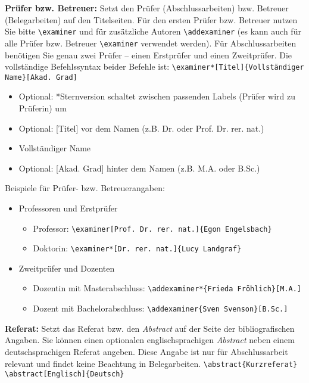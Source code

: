 \documentclass[
%
	thesis=paper,		%
	compactlistof,		%
	noauthorship,		%
%
	fancy,				%
%
%
]{hsmw-thesis}
\begin{document}
	\textbf{Prüfer bzw. Betreuer:}\label{cmd:examiner}
	Setzt den Prüfer (Abschlussarbeiten) bzw. Betreuer (Belegarbeiten) auf den Titelseiten.
	Für den ersten Prüfer bzw. Betreuer nutzen Sie bitte \verb|\examiner| und für zusätzliche Autoren \verb|\addexaminer| (es kann auch für alle Prüfer bzw. Betreuer \verb|\examiner| verwendet werden).
	Für Abschlussarbeiten benötigen Sie genau zwei Prüfer --  einen Erstprüfer und einen Zweitprüfer.
	Die vollständige Befehlssyntax beider Befehle ist:
	\newline
	\verb|\examiner*[Titel]{Vollständiger Name}[Akad. Grad]|
	\begin{itemize}
		\item Optional: *Sternversion schaltet zwischen passenden Labels (Prüfer wird zu Prüferin) um
		\item Optional: [Titel] vor dem Namen (z.B. Dr. oder Prof. Dr. rer. nat.)
		\item Vollständiger Name
		\item Optional: [Akad. Grad] hinter dem Namen (z.B. M.A. oder B.Sc.)
	\end{itemize}\vspace*{-\baselineskip}
	Beispiele für Prüfer- bzw. Betreuerangaben:
	\begin{itemize}
		\item Professoren und Erstprüfer
		\begin{itemize}
			\item Professor: \verb|\examiner[Prof. Dr. rer. nat.]{Egon Engelsbach}|
			\item Doktorin: \verb|\examiner*[Dr. rer. nat.]{Lucy Landgraf}|
		\end{itemize}
		\item Zweitprüfer und Dozenten
		\begin{itemize}
			\item Dozentin mit Masterabschluss: \verb|\addexaminer*{Frieda Fröhlich}[M.A.]|
			\item Dozent mit Bachelorabschluss: \verb|\addexaminer{Sven Svenson}[B.Sc.]|
		\end{itemize}
	\end{itemize}
	
	\textbf{Referat:}\label{cmd:abstract}
	Setzt das Referat bzw. den \textit{Abstract} auf der Seite der bibliografischen Angaben.
	Sie können einen optionalen englischsprachigen \textit{Abstract} neben einem deutschsprachigen Referat angeben.
	Diese Angabe ist nur für Abschlussarbeit relevant und findet keine Beachtung in Belegarbeiten.
	\newline
	\verb|\abstract{Kurzreferat}|
	\newline
	\verb|\abstract[Englisch]{Deutsch}|
	
\end{document}
